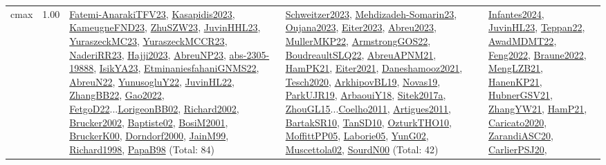 {\begin{longtable}{p{3cm}r>{\raggedright\arraybackslash}p{6cm}>{\raggedright\arraybackslash}p{6cm}>{\raggedright\arraybackslash}p{8cm}}
\index{cmax}\index{Concepts!cmax}cmax &  1.00 & \hyperref[detail:Fatemi-AnarakiTFV23]{Fatemi-AnarakiTFV23}, \hyperref[detail:Kasapidis2023]{Kasapidis2023}, \hyperref[detail:KameugneFND23]{KameugneFND23}, \hyperref[detail:ZhuSZW23]{ZhuSZW23}, \hyperref[detail:JuvinHHL23]{JuvinHHL23}, \hyperref[detail:YuraszeckMC23]{YuraszeckMC23}, \hyperref[detail:YuraszeckMCCR23]{YuraszeckMCCR23}, \hyperref[detail:NaderiRR23]{NaderiRR23}, \hyperref[detail:Hajji2023]{Hajji2023}, \hyperref[detail:AbreuNP23]{AbreuNP23}, \hyperref[detail:abs-2305-19888]{abs-2305-19888}, \hyperref[detail:IsikYA23]{IsikYA23}, \hyperref[detail:EtminaniesfahaniGNMS22]{EtminaniesfahaniGNMS22}, \hyperref[detail:AbreuN22]{AbreuN22}, \hyperref[detail:YunusogluY22]{YunusogluY22}, \hyperref[detail:JuvinHL22]{JuvinHL22}, \hyperref[detail:ZhangBB22]{ZhangBB22}, \hyperref[detail:Gao2022]{Gao2022}, \hyperref[detail:FetgoD22]{FetgoD22}...\hyperref[detail:LorigeonBB02]{LorigeonBB02}, \hyperref[detail:Richard2002]{Richard2002}, \hyperref[detail:Brucker2002]{Brucker2002}, \hyperref[detail:Baptiste02]{Baptiste02}, \hyperref[detail:BosiM2001]{BosiM2001}, \hyperref[detail:BruckerK00]{BruckerK00}, \hyperref[detail:Dorndorf2000]{Dorndorf2000}, \hyperref[detail:JainM99]{JainM99}, \hyperref[detail:Richard1998]{Richard1998}, \hyperref[detail:PapaB98]{PapaB98} (Total: 84) & \hyperref[detail:Schweitzer2023]{Schweitzer2023}, \hyperref[detail:Mehdizadeh-Somarin23]{Mehdizadeh-Somarin23}, \hyperref[detail:Oujana2023]{Oujana2023}, \hyperref[detail:Eiter2023]{Eiter2023}, \hyperref[detail:Abreu2023]{Abreu2023}, \hyperref[detail:MullerMKP22]{MullerMKP22}, \hyperref[detail:ArmstrongGOS22]{ArmstrongGOS22}, \hyperref[detail:BoudreaultSLQ22]{BoudreaultSLQ22}, \hyperref[detail:AbreuAPNM21]{AbreuAPNM21}, \hyperref[detail:HamPK21]{HamPK21}, \hyperref[detail:Eiter2021]{Eiter2021}, \hyperref[detail:Daneshamooz2021]{Daneshamooz2021}, \hyperref[detail:Tesch2020]{Tesch2020}, \hyperref[detail:ArkhipovBL19]{ArkhipovBL19}, \hyperref[detail:Novas19]{Novas19}, \hyperref[detail:ParkUJR19]{ParkUJR19}, \hyperref[detail:ArbaouiY18]{ArbaouiY18}, \hyperref[detail:Sitek2017a]{Sitek2017a}, \hyperref[detail:ZhouGL15]{ZhouGL15}...\hyperref[detail:Coelho2011]{Coelho2011}, \hyperref[detail:Artigues2011]{Artigues2011}, \hyperref[detail:BartakSR10]{BartakSR10}, \hyperref[detail:TanSD10]{TanSD10}, \hyperref[detail:OzturkTHO10]{OzturkTHO10}, \hyperref[detail:MoffittPP05]{MoffittPP05}, \hyperref[detail:Laborie05]{Laborie05}, \hyperref[detail:YunG02]{YunG02}, \hyperref[detail:Muscettola02]{Muscettola02}, \hyperref[detail:SourdN00]{SourdN00} (Total: 42) & \hyperref[detail:Infantes2024]{Infantes2024}, \hyperref[detail:JuvinHL23]{JuvinHL23}, \hyperref[detail:Teppan22]{Teppan22}, \hyperref[detail:AwadMDMT22]{AwadMDMT22}, \hyperref[detail:Feng2022]{Feng2022}, \hyperref[detail:Braune2022]{Braune2022}, \hyperref[detail:MengLZB21]{MengLZB21}, \hyperref[detail:HanenKP21]{HanenKP21}, \hyperref[detail:HubnerGSV21]{HubnerGSV21}, \hyperref[detail:ZhangYW21]{ZhangYW21}, \hyperref[detail:HamP21]{HamP21}, \hyperref[detail:Caricato2020]{Caricato2020}, \hyperref[detail:ZarandiASC20]{ZarandiASC20}, \hyperref[detail:CarlierPSJ20]{CarlierPSJ20}, 
\end{longtable}}

